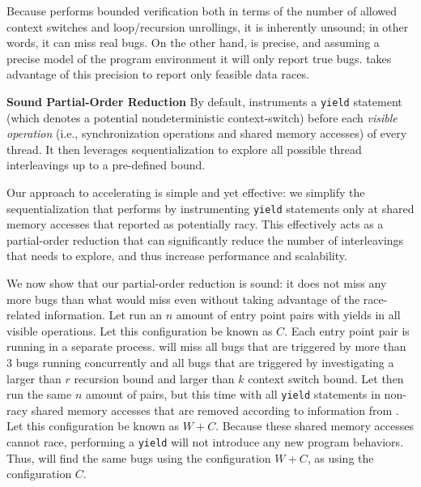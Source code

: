 Because \corral performs bounded verification both in terms of the number of allowed context switches and loop/recursion unrollings, it is inherently unsound; in other words, it can miss real bugs. On the other hand, \corral is precise, and assuming a precise model of the program environment it will only report true bugs. \whoop takes advantage of this precision to report only feasible data races.

\noindent
\textbf{Sound Partial-Order Reduction}\xspace\xspace By default, \corral instruments a \texttt{yield} statement (which denotes a potential nondeterministic context-switch) before each \emph{visible operation} (i.e., synchronization operations and shared memory accesses) of every thread. It then leverages sequentialization to explore all possible thread interleavings up to a pre-defined bound.

Our approach to accelerating \corral is simple and yet effective: we simplify
the sequentialization that \corral performs by instrumenting \texttt{yield}
statements only at shared memory accesses that \whoop reported as potentially
racy. This effectively acts as a partial-order reduction that can significantly
reduce the number of interleavings that \corral needs to explore, and thus
increase performance and scalability.

We now show that our partial-order reduction is sound: it does not miss any more
bugs than what \corral would miss even without taking advantage of the \whoop
race-related information. Let \corral run an $n$ amount of entry point pairs
with yields in all visible operations. Let this configuration be known as $C$.
Each entry point pair is running in a separate \corral process. \corral will
miss all bugs that are triggered by more than 3 bugs running concurrently and
all bugs that are triggered by investigating a larger than $r$ recursion bound
and larger than $k$ context switch bound. Let \corral then run the same $n$
amount of pairs, but this time with all \texttt{yield} statements in non-racy
shared memory accesses that are removed according to information from \whoop. Let this configuration be
known as $W+C$. Because these shared memory accesses cannot race, performing a
\texttt{yield} will not introduce any new program behaviors. Thus, \corral will
find the same bugs using the configuration $W+C$, as using the configuration
$C$.

